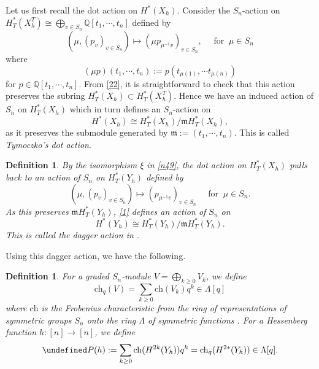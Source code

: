 \documentclass[11pt]{article}
\newtheorem{definition}[theo]{Definition}
\theoremstyle{definition}
\numberwithin{equation}{section}
\let\cal\undefined
\numberwithin{equation}{section}
\newcommand\QQ{\mathbb{Q}}
\newcommand{\cal}{\mathcal}
\newcommand\cP{{\cal P}}
\newcommand\ch{\mathrm{ch} }
\newcommand\beq{\begin{equation}}
\newcommand\eeq{\end{equation}}
\begin{document}
Let us first recall the dot action on $H^*(X_h)$. Consider the $S_n$-action on $H^*_T(X_h^T)\cong \bigoplus_{v\in S_n}\QQ[t_1,\cdots, t_n]$ defined by
\beq \label{19} (\mu,(p_v)_{v\in S_n})\mapsto (\mu p_{\mu^{-1}v})_{v\in S_n}, \quad \text{ for }~\mu\in S_n\eeq
where \beq\label{n13}
(\mu p)(t_1,\cdots,t_n):=p(t_{\mu(1)},\cdots t_{\mu(n)})\eeq 
for $p\in \QQ[t_1,\cdots, t_n]$. From \eqref{22}, it is straightforward to check that this action preserves the subring $H^*_T(X_h) \subset H^*_T(X_h^T)$. 
Hence we have an induced action of $S_n$ on $H^*_T(X_h)$ which in turn   
defines an $S_n$-action on 
\[ 
H^*(X_h)\cong H^*_T(X_h)/\mathfrak{m}H^*_T(X_h),\] 
as it preserves the submodule generated by $\mathfrak{m}:=(t_1,\cdots,t_n)$. This is called \emph{Tymoczko's dot action}.


\begin{definition} \cite{AB}
	By the isomorphism $\xi$ in \eqref{n49}, the dot action on $H^*_T(X_h)$ pulls back to an action of $S_n$ on $H^*_T(Y_h)$ defined by
\beq \label{1}(\mu,(p_v)_{v\in S_n})\mapsto (p_{\mu^{-1}v})_{v\in S_n} \quad \text{ for }~\mu\in S_n.\eeq
As this preserves $\mathfrak{m}H^*_T(Y_h)$, 
\eqref{1} defines an action of $S_n$ on 
\beq\label{n31}
H^*(Y_h)\cong H^*_T(Y_h)/\mathfrak{m}H^*_T(Y_h).\eeq
This is called the \emph{dagger action} in \cite{MS}.
\end{definition}


Using this dagger action, we have the following. 
\begin{definition} \label{30}
For a graded $S_n$-module $V=\bigoplus_{k\ge 0} V_k$, we define
$$\ch_q(V)=\sum_{k\ge 0} \ch(V_k) q^k\in \Lambda[q]$$
where  
	$\ch$ is the Frobenius characteristic from the ring of representations of symmetric groups $S_n$ onto the ring $\Lambda$ of symmetric functions \cite[\S I.7]{Mac}.
For a Hessenberg function $h:[n]\to [n]$, we define
	\[\cP(h):=\sum_{k\geq 0}\ch(H^{2k}(Y_h))q^k=\ch_q(H^{2*}(Y_h)) \in \Lambda[q].\]
\end{definition}
\end{document}
